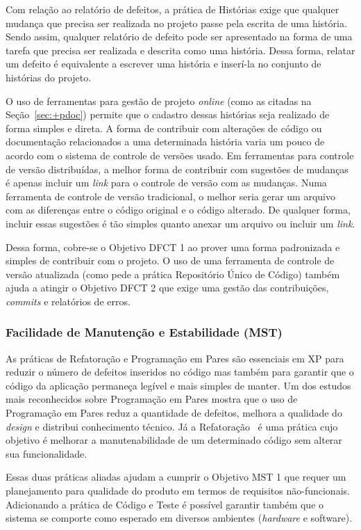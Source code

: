 Com relação ao relatório de defeitos, a prática de Histórias exige que
qualquer mudança que precisa ser realizada no projeto passe pela
escrita de uma história. Sendo assim, qualquer relatório de defeito
pode ser apresentado na forma de uma tarefa que precisa ser realizada
e descrita como uma história. Dessa forma, relatar um defeito é
equivalente a escrever uma história e inserí-la no conjunto de
histórias do projeto.

O uso de ferramentas para gestão de projeto \emph{online} (como as
citadas na Seção~\ref{sec:+pdoc}) permite que o cadastro dessas
histórias seja realizado de forma simples e direta. A forma de
contribuir com alterações de código ou documentação relacionados a uma
determinada história varia um pouco de acordo com o sistema de
controle de versões usado. Em ferramentas para controle de versão
distribuídas, a melhor forma de contribuir com sugestões de mudanças é
apenas incluir um \textit{link} para o controle de versão com as
mudanças. Numa ferramenta de controle de versão tradicional, o melhor
seria gerar um arquivo com as diferenças entre o código original e o
código alterado. De qualquer forma, incluir essas sugestões é tão
simples quanto anexar um arquivo ou incluir um \textit{link}.

Dessa forma, cobre-se o Objetivo DFCT 1 ao prover uma forma
padronizada e simples de contribuir com o projeto. O uso de uma
ferramenta de controle de versão atualizada (como pede a prática
Repositório Único de Código) também ajuda a atingir o Objetivo DFCT 2
que exige uma gestão das contribuições, \textit{commits} e relatórios
de erros.

\subsubsection{Facilidade de Manutenção e Estabilidade (MST)}
\label{sec:+mst}

As práticas de Refatoração e Programação em Pares são essenciais em XP
para reduzir o número de defeitos inseridos no código mas também para
garantir que o código da aplicação permaneça legível e mais simples de
manter. Um dos estudos mais reconhecidos sobre Programação em Pares
\cite{Williams2000} mostra que o uso de Programação em Pares reduz a
quantidade de defeitos, melhora a qualidade do \textit{design} e
distribui conhecimento técnico. Já a Refatoração~\cite{Refac01} é uma
prática cujo objetivo é melhorar a manutenabilidade de um determinado
código sem alterar sua funcionalidade.

Essas duas práticas aliadas ajudam a cumprir o Objetivo MST 1 que
requer um planejamento para qualidade do produto em termos de
requisitos não-funcionais. Adicionando a prática de Código e Teste é
possível garantir também que o sistema se comporte como esperado em
diversos ambientes (\textit{hardware} e software).

